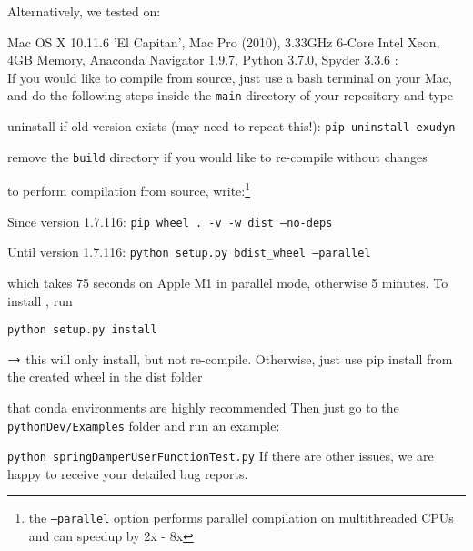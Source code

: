 Alternatively, we tested on:
\bi
  \item Mac OS X 10.11.6 'El Capitan', Mac Pro (2010), 3.33GHz 6-Core Intel Xeon, 4GB Memory, Anaconda Navigator 1.9.7, Python 3.7.0, Spyder 3.3.6
\ei
%
\vspace{9pt}
:\vspace{3pt}\\
If you would like to compile from source, just use a bash terminal on your Mac, and do the following steps inside the \texttt{main} directory of your repository and type
\bi
  \item uninstall if old version exists (may need to repeat this!): \texttt{pip uninstall exudyn}
  \item remove the \texttt{build} directory if you would like to re-compile without changes
  \item to perform compilation from source, write:\footnote{the \texttt{--parallel} option performs parallel compilation on multithreaded CPUs and can speedup by 2x - 8x}
  \item Since version 1.7.116: \texttt{pip wheel . -v -w dist --no-deps}
  \item Until version 1.7.116: \texttt{python setup.py bdist\_wheel --parallel}
  \item which takes 75 seconds on Apple M1 in parallel mode, otherwise 5 minutes. To install \codeName, run
  \item[] \texttt{python setup.py install}
  \item[] $\rightarrow$ this will only install, but not re-compile. Otherwise, just use pip install from the created wheel in the dist folder
  \item[]  that conda environments are highly recommended
\ei
Then just go to the \texttt{pythonDev/Examples} folder and run an example:
\bi
  \item[] \texttt{python springDamperUserFunctionTest.py}
\ei
If there are other issues, we are happy to receive your detailed bug reports. 

